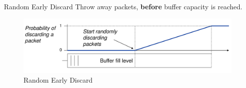 \documentclass[english]{panikzettel}
\begin{document}
	\begin{defi}{Random Early Discard}
		Throw away packets, \textbf{before} buffer capacity is reached.
		\begin{figure}[H]
			\centering
			\includegraphics[width=\textwidth]{img/2-red.png}
			\caption{Random Early Discard}
			\label{img-2-red}
		\end{figure}
	\end{defi}
	




	
	
	
	

	


		
	

	
				
\end{document}
